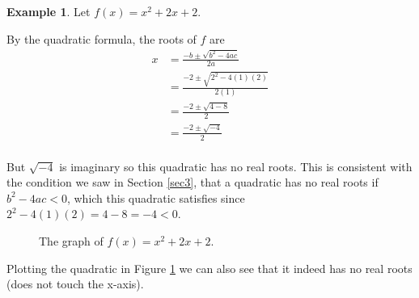 \documentclass[12pt, letterpaper]{article}
\theoremstyle{definition}
\newtheorem{ex}[thm]{Example}
\begin{document}
\begin{ex}
  Let \(f(x) = x^2 + 2x + 2\).

  By the quadratic formula, the roots of \(f\) are
  \begin{align*}
  x &= \frac{-b \pm \sqrt{b^2 - 4ac}}{2a} \\
    &= \frac{-2 \pm \sqrt{2^2 - 4(1)(2)}}{2(1)} \\
    &= \frac{-2 \pm \sqrt{4 - 8}}{2} \\
    &= \frac{-2 \pm \sqrt{-4}}{2} \\
  \end{align*}

  But \(\sqrt{-4}\) is imaginary so this quadratic has no real roots.
  This is consistent with the condition we saw in Section \ref{sec3},
  that a quadratic has no real roots if \(b^2 - 4a c < 0\),
  which this quadratic satisfies since \(2^2 - 4(1)(2) = 4 - 8 = -4 < 0\).

  \begin{figure}[ht]
      \centering
      \caption{The graph of $f(x)=x^2+2x+2$.}
      \label{fig:graph3}
  \end{figure}

  Plotting the quadratic in Figure \ref{fig:graph3} we can also see that it indeed has
  no real roots (does not touch the x-axis).
\end{ex}





% 
\end{document}

